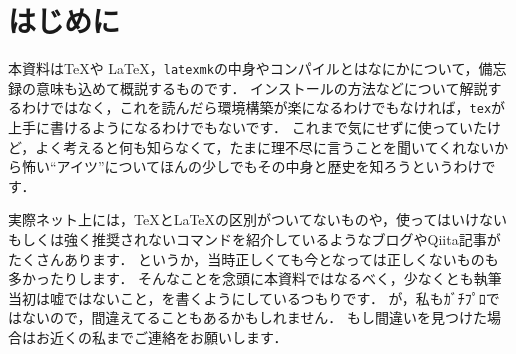 \documentclass[./main]{subfiles}
\begin{document}
\section{はじめに}
\noindent
本資料は\TeX や \LaTeX ，\verb|latexmk|の中身やコンパイルとはなにかについて，備忘録の意味も込めて概説するものです．
インストールの方法などについて解説するわけではなく，これを読んだら環境構築が楽になるわけでもなければ，\verb|tex|が上手に書けるようになるわけでもないです．
これまで気にせずに使っていたけど，よく考えると何も知らなくて，たまに理不尽に言うことを聞いてくれないから怖い``アイツ''についてほんの少しでもその中身と歴史を知ろうというわけです．

実際ネット上には，\TeX と\LaTeX の区別がついてないものや，使ってはいけないもしくは強く推奨されないコマンドを紹介しているようなブログやQiita記事がたくさんあります．
というか，当時正しくても今となっては正しくないものも多かったりします．
そんなことを念頭に本資料ではなるべく，少なくとも執筆当初は嘘ではないこと，を書くようにしているつもりです．
が，私もｶﾞﾁﾌﾟﾛではないので，間違えてることもあるかもしれません．
もし間違いを見つけた場合はお近くの私までご連絡をお願いします．


\ifSubfilesClassLoaded{%
  \printbibliography
}{}
\end{document}
